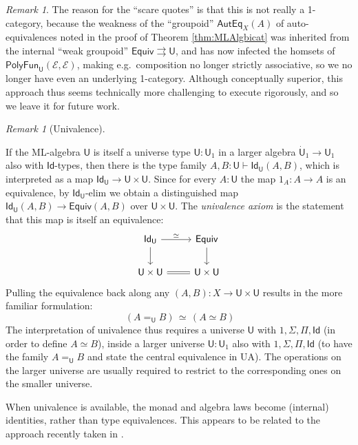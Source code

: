 \documentclass[12pt,reqno]{amsart}
\newcommand{\EE}{\ensuremath{\mathcal{E}}}
\renewcommand{\to}{\ensuremath{\rightarrow}}
\newcommand{\tto}{\ensuremath{\rightrightarrows}}
\newcommand{\Id}{\mathsf{Id}}
\newcommand{\T}{\ensuremath{\mathsf{U}}}
\newcommand{\TT}{\ensuremath{\dot{\mathsf{U}}}}
\theoremstyle{remark}
\newtheorem{remark}[theorem]{Remark}
\theoremstyle{definition}
\begin{document}
\begin{remark}
The reason for the ``scare quotes'' is that this is not really a 1-category, because the weakness of the ``groupoid'' $\mathsf{AutEq}_X(A)$ of auto-equivalences noted in the proof of Theorem \ref{thm:MLAlgbicat} was inherited from the internal ``weak groupoid''  $\mathsf{Equiv} \tto \T$, and has now infected the homsets of $\mathsf{PolyFun}_\T(\EE, \EE)$, making e.g.\ composition no longer strictly associative, so we no longer have even an underlying 1-category.  Although conceptually superior, this approach thus seems technically more challenging to execute rigorously, and so we leave it for future work.
\end{remark}

\begin{remark}[Univalence]\label{remark:univalence}

If the ML-algebra $\T$ is itself a universe type $\T : \T_1$ in a larger algebra $\TT_1 \to \T_1$ also with $\Id{}$-types, then there is the type family $A, B: \T \vdash \Id_{\T}(A,B)$, which is interpreted as a map $\Id_{\T}\to \T \times \T$.  Since for every $A:\T$ the map $1_A : A \to A$ is an equivalence, by $\Id_{\T}$-elim we obtain a distinguished map  $\Id_{\T}(A, B) \to \mathsf{Equiv}(A, B)$ over $\T \times \T$.  The \emph{univalence axiom} is the statement that this map is itself an equivalence:
\begin{equation}\label{diag:univalence4}
\begin{tikzcd} 
\Id_{\T} \ar[d] \ar[r, "{\simeq}"] & \mathsf{Equiv} \ar[d] \\  
 \T \times \T  \ar[r, equals] & \T \times \T
	 \end{tikzcd}
 \end{equation}
 Pulling the equivalence back along any $(A, B) : X \to \T \times \T$ results in the more familiar formulation:
 \[\tag{UA}
 \ (A =_\T B) \, \simeq\, (A \simeq B)
 \]
The interpretation of univalence thus requires a universe $\T$ with $1, \Sigma, \Pi, \Id{}$ (in order to define $A\simeq B$), inside a larger universe $\T:\T_1$ also with $1, \Sigma, \Pi, \Id{}$ (to have the family $A =_\T B$ and state the central equivalence in UA). The operations on the larger universe are usually required to restrict to the corresponding ones on the smaller universe.  

When univalence is available, the monad and algebra laws become (internal) identities, rather than type equivalences.  This appears to be related to the approach recently taken in \cite{AberleSpivak:2024}.
\end{remark}
 
\end{document}
